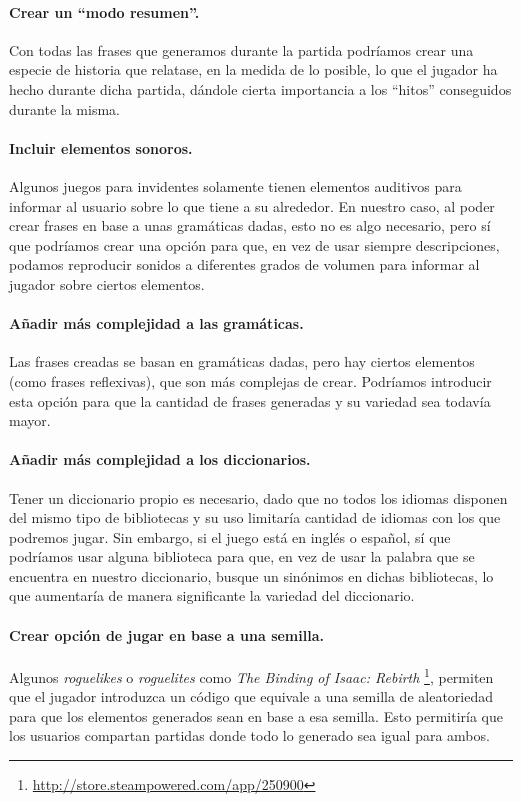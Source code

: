 \paragraph{Crear un ``modo resumen''.} Con todas las frases que generamos durante la partida podríamos crear una especie de historia que relatase, en la medida de lo posible, lo que el jugador ha hecho durante dicha partida, dándole cierta importancia a los ``hitos'' conseguidos durante la misma.

\paragraph{Incluir elementos sonoros.} Algunos juegos para invidentes solamente tienen elementos auditivos para informar al usuario sobre lo que tiene a su alrededor. En nuestro caso, al poder crear frases en base a unas gramáticas dadas, esto no es algo necesario, pero sí que podríamos crear una opción para que, en vez de usar siempre descripciones, podamos reproducir sonidos a diferentes grados de volumen para informar al jugador sobre ciertos elementos.

\paragraph{Añadir más complejidad a las gramáticas.} Las frases creadas se basan en gramáticas dadas, pero hay ciertos elementos (como frases reflexivas), que son más complejas de crear. Podríamos introducir esta opción para que la cantidad de frases generadas y su variedad sea todavía mayor. 

\paragraph{Añadir más complejidad a los diccionarios.} Tener un diccionario propio es necesario, dado que no todos los idiomas disponen del mismo tipo de bibliotecas y su uso limitaría cantidad de idiomas con los que podremos jugar. Sin embargo, si el juego está en inglés o español, sí que podríamos usar alguna biblioteca para que, en vez de usar la palabra que se encuentra en nuestro diccionario, busque un sinónimos en dichas bibliotecas, lo que aumentaría de manera significante la variedad del diccionario. 

\paragraph{Crear opción de jugar en base a una semilla.} Algunos \textit{roguelikes} o \textit{roguelites} como \textit{The Binding of Isaac: Rebirth} \footnote{\url{http://store.steampowered.com/app/250900}}, permiten que el jugador introduzca un código que equivale a una semilla de aleatoriedad para que los elementos generados sean en base a esa semilla. Esto permitiría que los usuarios compartan partidas donde todo lo generado sea igual para ambos.